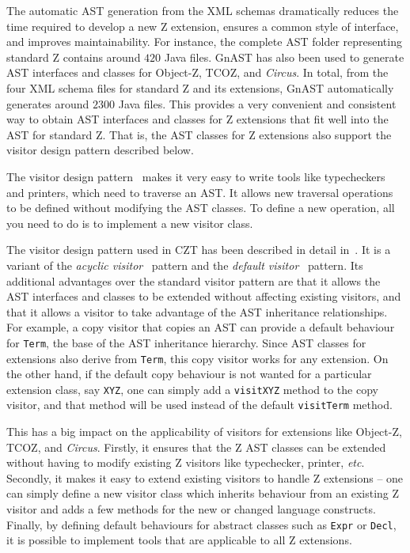 \documentclass{llncs}
\newcommand{\Circus}{{\sf\slshape Circus}}
\newcommand{\Interface}[1]{\texttt{#1}}
\begin{document}
  The automatic AST generation from the XML schemas dramatically
  reduces the time required to develop a new Z extension, ensures a
  common style of interface, and improves maintainability.  For
  instance, the complete AST folder representing standard Z contains
  around $420$ Java files.  GnAST has also been used to generate AST
  interfaces and classes for Object-Z, TCOZ, and \Circus.  In total,
  from the four XML schema files for standard Z and its extensions,
  GnAST automatically generates around $2300$ Java files.  This
  provides a very convenient and consistent way to obtain AST interfaces
  and classes for Z extensions that fit well into the AST for standard Z.
  That is, the AST classes for Z extensions also support the visitor design
  pattern described below.

  The visitor design pattern~\cite{GamEA:95,MaiCha:01} makes it very
  easy to write tools like typecheckers and printers, which need to
  traverse an AST.  It allows new traversal operations to be defined
  without modifying the AST classes.  To define a new operation, all
  you need to do is to implement a new visitor class.

  The visitor design pattern used in CZT has been described in detail
  in~\cite{czt}.  It is a variant of the \emph{acyclic
  visitor}~\cite{Mar:97} pattern and the \emph{default
  visitor}~\cite{Nor:97} pattern.  Its additional advantages over the
  standard visitor pattern are that it allows the AST interfaces and
  classes to be extended without affecting existing visitors, and that
  it allows a visitor to take advantage of the AST inheritance
  relationships.  For example, a copy visitor that copies an AST can
  provide a default behaviour for \Interface{Term}, the base of the
  AST inheritance hierarchy.  Since AST classes for extensions also
  derive from \Interface{Term}, this copy visitor works for any
  extension.  On the other hand, if the default copy behaviour is not
  wanted for a particular extension class, say \texttt{XYZ}, one can
  simply add a \texttt{visitXYZ} method to the copy visitor, and that
  method will be used instead of the default \texttt{visitTerm}
  method.

  This has a big impact on the applicability of visitors for
  extensions like Object-Z, TCOZ, and \Circus.  Firstly, it ensures
  that the Z AST classes can be extended without having to modify
  existing Z visitors like typechecker, printer, \textit{etc}. 
  Secondly, it makes it easy to extend existing visitors
  to handle Z extensions -- one can simply define a new visitor class
  which inherits behaviour from an existing Z visitor and adds a few
  methods for the new or changed language constructs.
  Finally, by defining default behaviours for abstract classes such as
  \texttt{Expr} or \texttt{Decl}, it is possible to implement tools 
  that are applicable to all Z extensions.
\end{document}
